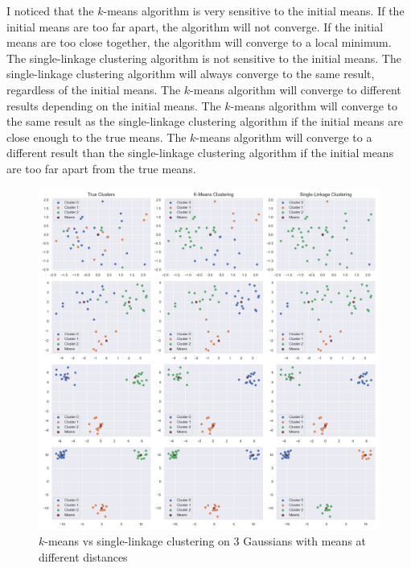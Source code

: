 \documentclass{article}
\begin{document}
    I noticed that the $k$-means algorithm is very sensitive to the initial means. If the initial means are too far apart, the algorithm will not converge. If the initial means are too close together, the algorithm will converge to a local minimum. The single-linkage clustering algorithm is not sensitive to the initial means. The single-linkage clustering algorithm will always converge to the same result, regardless of the initial means. The $k$-means algorithm will converge to different results depending on the initial means. The $k$-means algorithm will converge to the same result as the single-linkage clustering algorithm if the initial means are close enough to the true means. The $k$-means algorithm will converge to a different result than the single-linkage clustering algorithm if the initial means are too far apart from the true means.

    \begin{figure}[h]
        \label{fig:kmeans_singlelinkage}
        \includegraphics[width=0.99\linewidth]{images/q1/kmeans_singlelinkage.png}
        \caption{$k$-means vs single-linkage clustering on $3$ Gaussians with means at different distances}
    \end{figure}
    \pagebreak
\end{document}
